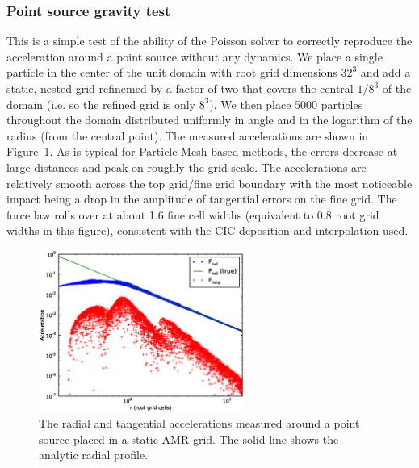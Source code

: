 \subsubsection{Point source gravity test}
\label{sec.test.gravitypointsource}

This is a simple test of the ability of the Poisson solver to
correctly reproduce the acceleration around a point source without any
dynamics.  We place a single particle in the center of the unit domain
with root grid dimensions $32^3$ and add a static, nested grid 
refinemed by a factor of two that covers the central $1/8^3$ of the
domain (i.e. so the refined grid is only $8^3$).  We then place 5000
particles throughout the domain distributed uniformly in angle and
in the logarithm of the radius (from the central point).  The
measured accelerations are shown in Figure~\ref{fig.gravitytest}.  As
is typical for Particle-Mesh based methods, the errors decrease at
large distances and peak on roughly the grid scale.  The accelerations
are relatively smooth across the top grid/fine grid boundary with the
most noticeable impact being a drop in the amplitude of tangential
errors on the fine grid.  The force law rolls over at about 1.6 fine
cell widths (equivalent to 0.8 root grid widths in this figure),
consistent with the CIC-deposition and interpolation used.

\begin{figure}
\begin{center}
\includegraphics[width=0.6\textwidth]{figures/GravityTest.eps}
\caption{The radial and tangential accelerations measured around a point source placed in a static AMR grid.  The solid line shows the analytic radial profile.}
\label{fig.gravitytest}
\end{center}
\end{figure}
